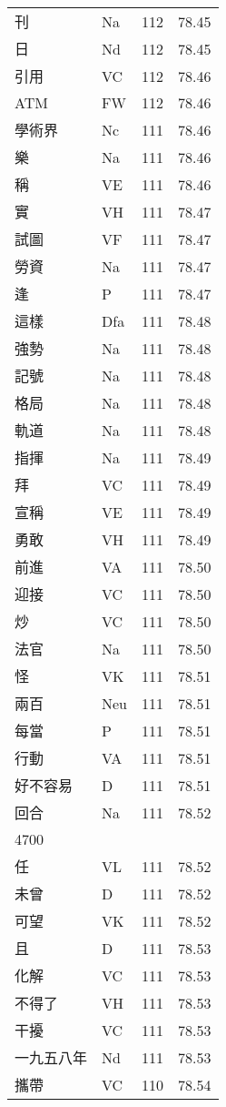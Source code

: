 \documentclass[twocolumn]{book}
\begin{document}
\begin{supertabular}{llrr}
刊 & Na & 112 &  78.45\\
日 & Nd & 112 &  78.45\\
引用 & VC & 112 &  78.46\\
ATM & FW & 112 &  78.46\\
學術界 & Nc & 111 &  78.46\\
樂 & Na & 111 &  78.46\\
稱 & VE & 111 &  78.46\\
實 & VH & 111 &  78.47\\
試圖 & VF & 111 &  78.47\\
勞資 & Na & 111 &  78.47\\
逢 & P & 111 &  78.47\\
這樣 & Dfa & 111 &  78.48\\
強勢 & Na & 111 &  78.48\\
記號 & Na & 111 &  78.48\\
格局 & Na & 111 &  78.48\\
軌道 & Na & 111 &  78.48\\
指揮 & Na & 111 &  78.49\\
拜 & VC & 111 &  78.49\\
宣稱 & VE & 111 &  78.49\\
勇敢 & VH & 111 &  78.49\\
前進 & VA & 111 &  78.50\\
迎接 & VC & 111 &  78.50\\
炒 & VC & 111 &  78.50\\
法官 & Na & 111 &  78.50\\
怪 & VK & 111 &  78.51\\
兩百 & Neu & 111 &  78.51\\
每當 & P & 111 &  78.51\\
行動 & VA & 111 &  78.51\\
好不容易 & D & 111 &  78.51\\
回合 & Na & 111 &  78.52\\
4700\\
任 & VL & 111 &  78.52\\
未曾 & D & 111 &  78.52\\
可望 & VK & 111 &  78.52\\
且 & D & 111 &  78.53\\
化解 & VC & 111 &  78.53\\
不得了 & VH & 111 &  78.53\\
干擾 & VC & 111 &  78.53\\
一九五八年 & Nd & 111 &  78.53\\
攜帶 & VC & 110 &  78.54\\

\end{supertabular}
\end{document}
